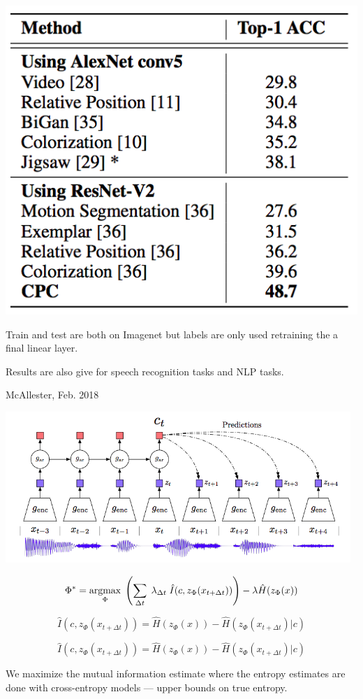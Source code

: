{\centerline{\includegraphics[height=3.5 in]{../images/LearnRepCTCc}}

Train and test are both on Imagenet but labels are only used retraining the a final linear layer.

\vfill
Results are also give for speech recognition tasks and NLP tasks.


{McAllester, Feb. 2018}

\centerline{\includegraphics[height=2.25in]{../images/MMI-PC}}

$$\Phi^* = \operatorname*{argmax}_\Phi\;\left(\sum_{\Delta t} \;\lambda_{\Delta t}\; \hat{I}(c,z_\Phi(x_{t+\Delta t}))\right) - \lambda \hat{H}(z_\Phi(x))$$

\vfill
$$\hat{I}(c,z_\Phi(x_{t+ \Delta t})) = \hat{H}(z_\Phi(x)) - \hat{H}(z_\Phi(x_{t+\Delta t})|c)$$


$$\hat{I}(c,z_\Phi(x_{t+ \Delta t})) = \hat{H}(z_\Phi(x)) - \hat{H}(z_\Phi(x_{t+\Delta t})|c)$$

We maximize the mutual information estimate where the entropy estimates are done with cross-entropy models --- upper bounds on true entropy.

}
